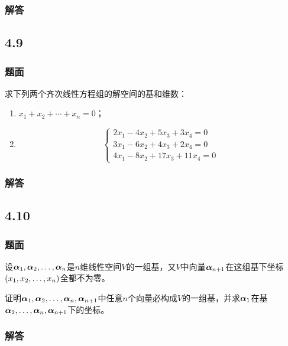 \documentclass{beamer}
\begin{document}
\begin{frame}
    \frametitle{解答}



\end{frame}

\subsection*{4.9}
\begin{frame}
    \frametitle{题面}

    求下列两个齐次线性方程组的解空间的基和维数：
    \begin{enumerate}
        \item \(x_1+x_2+\cdots+x_n=0\)；
        \item \begin{equation*}
                  \begin{cases}
                      2x_1-4x_2+5x_3+3x_4=0 \\
                      3x_1-6x_2+4x_3+2x_4=0 \\
                      4x_1-8x_2+17x_3+11x_4=0
                  \end{cases}
              \end{equation*}
    \end{enumerate}

\end{frame}

\begin{frame}
    \frametitle{解答}



\end{frame}

\subsection*{4.10}
\begin{frame}
    \frametitle{题面}

    设\({\boldsymbol{\alpha}}_1,{\boldsymbol{\alpha}}_2,\dots,{\boldsymbol{\alpha}}_{n}\)是\(n\)维线性空间\(V\)的一组基，又\(V\)中向量\(\boldsymbol{\alpha}_{n+1}\)在这组基下坐标\(\left( {x}_1,{x}_2,\dots,{x}_{n} \right)\)全都不为零。

    证明\({\boldsymbol{\alpha}}_1,{\boldsymbol{\alpha}}_2,\dots,{\boldsymbol{\alpha}}_{n},\boldsymbol{\alpha}_{n+1}\)中任意\(n\)个向量必构成\(V\)的一组基，并求\(\boldsymbol{\alpha}_1\)在基\(\boldsymbol{\alpha}_2,\dots,\boldsymbol{\alpha}_n,\boldsymbol{\alpha}_{n+1}\)下的坐标。

\end{frame}

\begin{frame}
    \frametitle{解答}



\end{frame}
\end{document}

